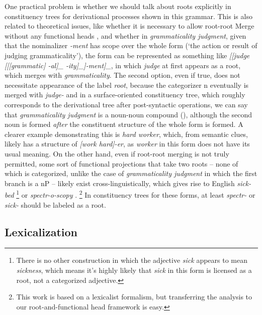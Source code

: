\documentclass[UTF8, a4paper, oneside, scheme=plain, 12pt]{ctexrep}
\newcommand*{\term}[1]{\emph{#1}}
\newcommand{\form}[1]{\emph{#1}}
\newcommand{\translate}[1]{`#1'}
\begin{document}
{One practical problem is whether we should talk about roots explicitly in 
constituency trees for derivational processes shown in this grammar.
This is also related to theoretical issues,
like whether it is necessary to allow root-root Merge without any functional heads \citep{zhang2007root},
and whether in \form{grammaticality judgment},
given that the nominalizer \form{-ment} has scope over the whole form
(\translate{the action or result of judging grammaticality}),
the form can be represented
as something like \form{[[judge [[[grammatic] -al]_{} -ity]_{}]-ment]_{\text{N}}},
in which \form{judge} at first appears as a root,
which merges with \form{grammaticality}.
The second option, even if true, does not necessitate appearance of the label \term{root},
because the categorizer n eventually is merged with \form{judge-}
and in a surface-oriented constituency tree, which roughly corresponds to the derivational tree after post-syntactic operations, we can say that \form{grammaticality judgment} is a noun-noun compound
(),
although the second noun is formed \emph{after} the constituent structure of the whole form is formed.
A clearer example demonstrating this is \form{hard worker},
which, from semantic clues, likely has a structure of \form{[work hard]-er},
as \form{worker} in this form does not have its usual meaning.
On the other hand, even if root-root merging is not truly permitted,
some sort of functional projections that take two roots -- none of which is categorized,
unlike the case of \form{grammaticality judgment} in which the first branch is a nP --
likely exist cross-linguistically, which gives rise to English \form{sick-bed}%
\footnote{
    There is no other construction in which the adjective \form{sick} appears to mean \form{sickness},
    which means it's highly likely that \form{sick} in this form is licensed as a root,
    not a categorized adjective.
}
or \form{spectr-o-scopy} \citep{di2005decomposing}.%
\footnote{
    This work is based on a lexicalist formalism,
    but transferring the analysis to our root-and-functional head framework is easy.
}
In constituency trees for these forms, at least \form{spectr-} or \form{sick-} should be labeled as a root.

\subsection{Lexicalization}\label{sec:intro.theory.lexicon}

}
\end{document}
